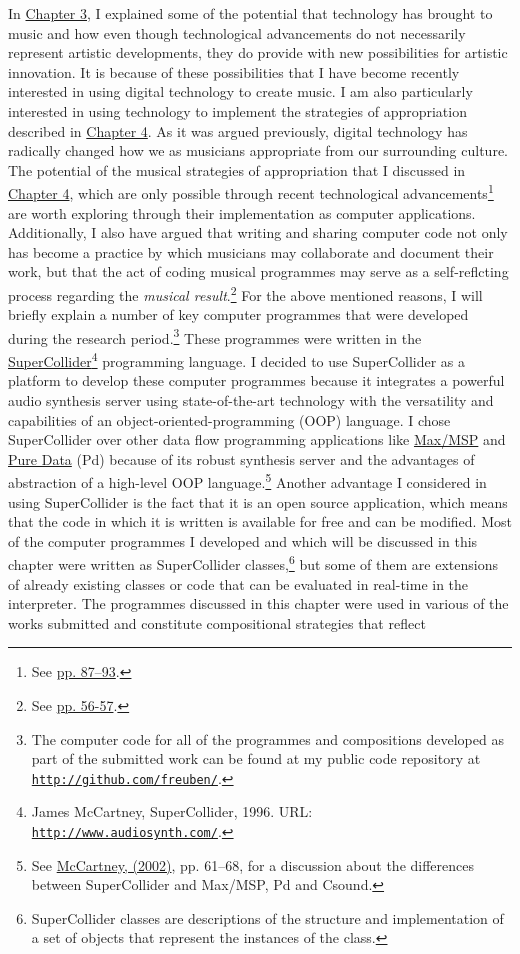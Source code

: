 In \hyperlink{chapter3}{Chapter 3}, I explained some of the potential that technology has brought to music and how even though technological advancements do not necessarily represent artistic developments, they do provide with new possibilities for artistic innovation. It is because of these possibilities that I have become recently interested in using digital technology to create music. I am also particularly interested in using technology to implement the strategies of appropriation described in \hyperlink{chapter4}{Chapter 4}. As it was argued previously, digital technology has radically changed how we as musicians appropriate from our surrounding culture. The potential of the musical strategies of appropriation that I discussed in \hyperlink{chapter4}{Chapter 4}, which are only possible through recent technological advancements\footnote{See \hyperlink{elaborationapprop}{pp. 87--93}.} are worth exploring through their implementation as computer applications. Additionally, I also have argued that writing and sharing computer code not only has become a practice by which musicians may collaborate and document their work, but that the act of coding musical programmes may serve as a self-reflcting process regarding the \emph{musical result}.\footnote{See \hyperlink{codingcons}{pp. 56-57}.} For the above mentioned reasons, I will briefly explain a number of key computer programmes that were developed during the research period.\footnote{The computer code for all of the programmes and compositions developed as part of the submitted work can be found at my public code repository at \href{http://github.com/freuben/}{\texttt{http://github.com/freuben/}}.} These programmes were written in the \href{http://www.audiosynth.com/}{\mbox{SuperCollider}}\footnote{James McCartney, SuperCollider, 1996. URL: \href{http://www.audiosynth.com/}{\texttt{http://www.audiosynth.com/}}.} programming language. I decided to use SuperCollider as a platform to develop these computer programmes because it integrates a powerful audio synthesis server using state-of-the-art technology with the versatility and capabilities of an object-oriented-programming (OOP) language. I chose SuperCollider over other data flow programming applications like \href{http://www.cycling74.com/}{Max/MSP} and \href{http://puredata.info/}{Pure Data} (Pd) because of its robust synthesis server and the advantages of abstraction of a high-level OOP language.\footnote{See \hyperlink{mccartney}{McCartney, (2002)}, pp. 61--68, for a discussion about the differences between SuperCollider and Max/MSP, Pd and Csound.} Another advantage I considered in using SuperCollider is the fact that it is an open source application, which means that the code in which it is written is available for free and can be modified. Most of the computer programmes I developed and which will be discussed in this chapter were written as SuperCollider classes,\footnote{SuperCollider classes are descriptions of the structure and implementation of a set of objects that represent the instances of the class.} but some of them are extensions of already existing classes or code that can be evaluated in real-time in the interpreter. The programmes discussed in this chapter were used in various of the works submitted and constitute compositional strategies that reflect 